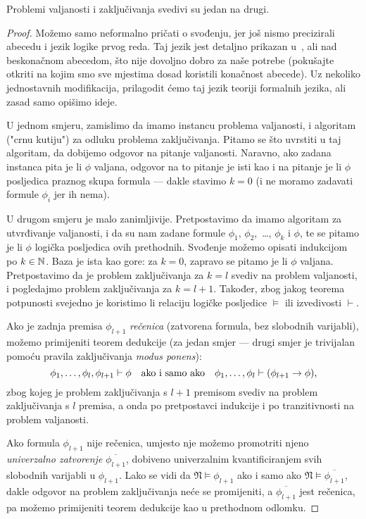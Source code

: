 \begin{propozicija}[{name=[međusobna svedivost valjanosti i zaključivanja]}]\label{pp:valj<>zaklj}
Problemi valjanosti i zaključivanja svedivi su jedan na drugi.
\end{propozicija}
\begin{proof}
Možemo samo neformalno pričati o svođenju, jer još nismo precizirali abecedu i jezik logike prvog reda. Taj jezik jest detaljno prikazan u~\cite{skr:VukML}, ali nad beskonačnom abecedom, što nije dovoljno dobro za naše potrebe (pokušajte otkriti na kojim smo sve mjestima dosad koristili konačnost abecede). Uz nekoliko jednostavnih modifikacija, prilagodit ćemo taj jezik teoriji formalnih jezika, ali zasad samo opišimo ideje.

U jednom smjeru, zamislimo da imamo instancu problema valjanosti, i algoritam ("crnu kutiju") za odluku problema zaključivanja. Pitamo se što uvrstiti u taj algoritam, da dobijemo odgovor na pitanje valjanosti. Naravno,  ako zadana instanca pita je li $\phi$ valjana, odgovor na to pitanje je isti kao i na pitanje je li $\phi$ posljedica praznog skupa formula --- dakle stavimo $k=0$ (i ne moramo zadavati formule $\phi_i$ jer ih nema).

U drugom smjeru je malo zanimljivije. Pretpostavimo da imamo algoritam za utvrđivanje valjanosti, i da su nam zadane formule $\phi_1$, $\phi_2$,~\ldots, $\phi_k$ i $\phi$, te se pitamo je li $\phi$ logička posljedica ovih prethodnih. Svođenje možemo opisati indukcijom po $k\in{\mathbb N}$. Baza je ista kao gore: za $k=0$, zapravo se pitamo je li $\phi$ valjana. Pretpostavimo da je problem zaključivanja za $k=l$ svediv na problem valjanosti, i pogledajmo problem zaključivanja za $k=l+1$. Također, zbog jakog teorema potpunosti svejedno je koristimo li relaciju logičke posljedice $\models$ ili izvedivosti $\vdash$.

Ako je zadnja premisa $\phi_{l+1}$ \emph{rečenica} (zatvorena formula, bez slobodnih varijabli), možemo primijeniti teorem dedukcije (za jedan smjer --- drugi smjer je trivijalan pomoću pravila zaključivanja \emph{modus ponens}):
\begin{equation}\label{eq:prebaci}
\phi_1,\dotsc,\phi_l,\phi_{l+1}\vdash\phi\text{\quad ako i samo ako\quad}
\phi_1,\dotsc,\phi_l\vdash(\phi_{l+1}\to\phi)\text,
\end{equation}
zbog kojeg je problem zaključivanja s $l+1$ premisom svediv na problem zaključivanja s $l$ premisa, a onda po pretpostavci indukcije i po tranzitivnosti na problem valjanosti.

Ako formula $\phi_{l+1}$ nije rečenica, umjesto nje možemo promotriti njeno \emph{univerzalno zatvorenje} $\overline{\phi_{l+1}}$, dobiveno univerzalnim kvantificiranjem svih slobodnih varijabli u $\phi_{l+1}$. Lako se vidi da $\mathfrak N\models\phi_{l+1}$ ako i samo ako $\mathfrak N\models\overline{\phi_{l+1}}$, dakle odgovor na problem zaključivanja neće se promijeniti, a $\overline{\phi_{l+1}}$ jest rečenica, pa možemo primijeniti teorem dedukcije kao u prethodnom odlomku.
\end{proof}
